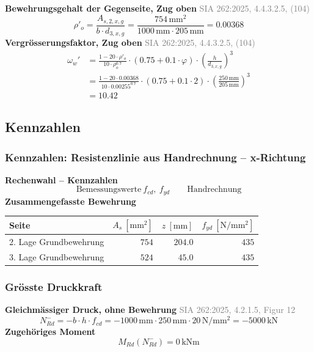 \documentclass[11pt,a4paper]{article}
\newcommand{\normref}[1]{{\small\textcolor{gray}{#1}}}
\begin{document}
\noindent\textbf{Bewehrungsgehalt der Gegenseite, Zug oben} \hfill \normref{SIA 262:2025, 4.4.3.2.5, (104)}
\begin{equation*}
\rho'_{o} = \frac{A_{s,2,x,g}}{b \cdot d_{3,x,g}} = \frac{754\,\mathrm{mm}^{2}}{1000\,\mathrm{mm} \cdot 205\,\mathrm{mm}} = 0.00368
\end{equation*}
\noindent\textbf{Vergrösserungsfaktor, Zug oben} \hfill \normref{SIA 262:2025, 4.4.3.2.5, (104)}
\begin{equation*}
\begin{aligned}
  \omega_w' &= \frac{1 - 20 \cdot \rho'_{o}}{10 \cdot \rho_{o}^{0.7}} \cdot \left(0.75 + 0.1 \cdot \varphi\right) \cdot \left(\frac{h}{d_{3,x,g}}\right)^{3} \\
  &= \frac{1 - 20 \cdot 0.00368}{10 \cdot 0.00255^{0.7}} \cdot \left(0.75 + 0.1 \cdot 2\right) \cdot \left(\frac{250\,\mathrm{mm}}{205\,\mathrm{mm}}\right)^{3} \\
  &= 10.42
\end{aligned}
\end{equation*}
\subsection{Kennzahlen}
\subsubsection{Kennzahlen: Resistenzlinie aus Handrechnung – x-Richtung}
\noindent\textbf{Rechenwahl – Kennzahlen}
\begin{equation*}
\text{Bemessungswerte}\ f_{cd},\ f_{yd} \qquad \text{Handrechnung}
\end{equation*}
\noindent\textbf{Zusammengefasste Bewehrung}
\begin{longtable}{lrrr}
\hline
Seite & $A_s\ [\mathrm{mm}^2]$ & $z\ [\mathrm{mm}]$ & $f_{yd}\ [\mathrm{N/mm^2}]$ \\
\hline
\endhead
2. Lage Grundbewehrung & $754$ & $204.0$ & $435$ \\
3. Lage Grundbewehrung & $524$ & $45.0$ & $435$ \\
\hline
\end{longtable}
\subsubsection{Grösste Druckkraft}
\noindent\textbf{Gleichmässiger Druck, ohne Bewehrung} \hfill \normref{SIA 262:2025, 4.2.1.5, Figur 12}
\begin{equation*}
N_{Rd}^{-} = -b \cdot h \cdot f_{cd} = -1000\,\mathrm{mm} \cdot 250\,\mathrm{mm} \cdot 20\,\mathrm{N}/\mathrm{mm}^{2} = -5000\,\mathrm{kN}
\end{equation*}
\noindent\textbf{Zugehöriges Moment}
\begin{equation*}
M_{Rd}(N_{Rd}^{-}) = 0\,\mathrm{kNm}
\end{equation*}
\end{document}
